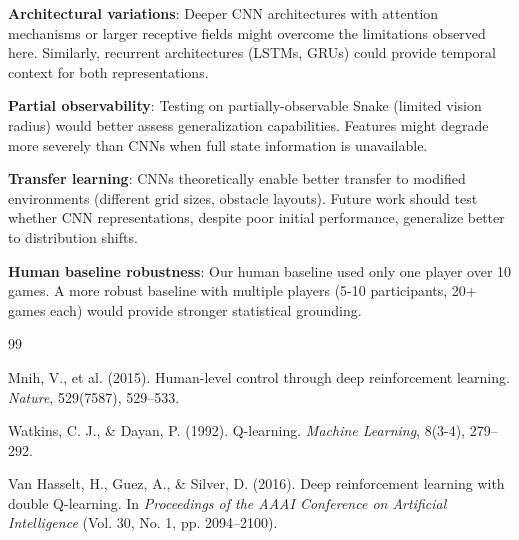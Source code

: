 \documentclass[10pt,a4paper,twocolumn]{article}
\begin{document}
\textbf{Architectural variations}: Deeper CNN architectures with attention mechanisms or larger receptive fields might overcome the limitations observed here. Similarly, recurrent architectures (LSTMs, GRUs) could provide temporal context for both representations.

\textbf{Partial observability}: Testing on partially-observable Snake (limited vision radius) would better assess generalization capabilities. Features might degrade more severely than CNNs when full state information is unavailable.

\textbf{Transfer learning}: CNNs theoretically enable better transfer to modified environments (different grid sizes, obstacle layouts). Future work should test whether CNN representations, despite poor initial performance, generalize better to distribution shifts.

\textbf{Human baseline robustness}: Our human baseline used only one player over 10 games. A more robust baseline with multiple players (5-10 participants, 20+ games each) would provide stronger statistical grounding.

\begin{thebibliography}{99}

Mnih, V., et al. (2015).
\newblock Human-level control through deep reinforcement learning.
\newblock \emph{Nature}, 529(7587), 529--533.

Watkins, C. J., \& Dayan, P. (1992).
\newblock Q-learning.
\newblock \emph{Machine Learning}, 8(3-4), 279--292.

Van Hasselt, H., Guez, A., \& Silver, D. (2016).
\newblock Deep reinforcement learning with double Q-learning.
\newblock In \emph{Proceedings of the AAAI Conference on Artificial Intelligence} (Vol. 30, No. 1, pp. 2094--2100).

\end{thebibliography}
\end{document}
